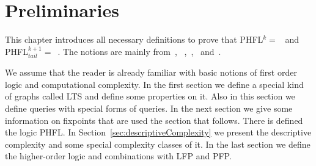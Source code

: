 \chapter{Preliminaries}
\label{ch:preliminaries}
This chapter introduces all necessary definitions to prove that PHFL$^k =$~ and
PHFL$^{k+1}_{tail} =$~. The notions are mainly from~\cite{immerman1999descriptive},
~\cite{papadimitriou1994complexity},~\cite{otto1999bisimulation},~\cite{freireMartins2011descriptive}
and~\cite{lange2014capturing}.

We assume that the reader is already familiar with basic notions of first order logic and computational complexity. In the first section we define a special kind of graphs called LTS and define some properties on it. Also in this section we define queries with special forms of queries. In the next section we give some information on fixpoints that are used the section that follows. There is defined the logic PHFL. In Section~\ref{sec:descriptiveComplexity} we present the descriptive complexity and some special complexity classes of it. In the last section we define the higher-order logic and combinations with LFP and PFP.










